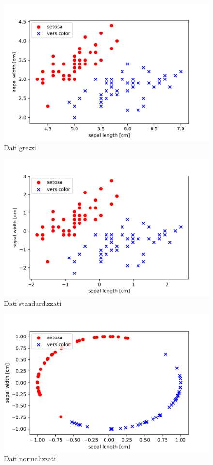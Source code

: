 \begin{figure}[h]
    \centering
    \includegraphics[width=\linewidth]{gfx/iris/iris2features}
    \caption{Dati grezzi}
    \label{fig:iris_grezzi}
\end{figure}

\begin{figure}[h]
    \centering
    \includegraphics[width=\linewidth]{gfx/iris/iris2scaled}
    \caption{Dati standardizzati}
    \label{fig:iris_standard}
\end{figure}

\begin{figure}[h]
    \centering
    \includegraphics[width=\linewidth]{gfx/iris/iris2normalized}
    \caption{Dati normalizzati}
    \label{fig:iris_normal}
\end{figure}

